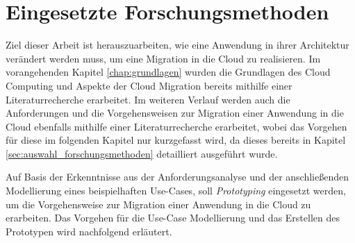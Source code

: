 \chapter{Eingesetzte Forschungsmethoden}
\label{chap:forschungsmethoden}
Ziel dieser Arbeit ist herauszuarbeiten, wie eine Anwendung in ihrer Architektur verändert werden muss, um eine Migration in die Cloud zu realisieren. Im vorangehenden Kapitel \ref{chap:grundlagen} wurden die Grundlagen des Cloud Computing und Aspekte der Cloud Migration bereits mithilfe einer Literaturrecherche erarbeitet. Im weiteren Verlauf werden auch die Anforderungen und die Vorgehensweisen zur Migration einer Anwendung in die Cloud ebenfalls mithilfe einer Literaturrecherche erarbeitet, wobei das Vorgehen für diese im folgenden Kapitel nur kurzgefasst wird, da dieses bereits in Kapitel \ref{sec:auswahl_forschungsmethoden} detailliert ausgeführt wurde.

Auf Basis der Erkenntnisse aus der Anforderungsanalyse und der anschließenden Modellierung eines beispielhaften Use-Cases, soll \textit{Prototyping} eingesetzt werden, um die Vorgehensweise zur Migration einer Anwendung in die Cloud zu erarbeiten. Das Vorgehen für die Use-Case Modellierung und das Erstellen des Prototypen wird nachfolgend erläutert.


% 

